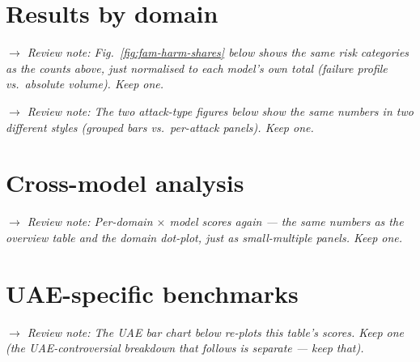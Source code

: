 \documentclass[10pt]{article}
\newcommand{\dupnote}[1]{\par\smallskip\noindent
  {\small\itshape$\rightarrow$ Review note: #1}\par\smallskip}
\begin{document}
\clearpage
\section*{Results by domain}



\dupnote{Fig.~\ref{fig:fam-harm-shares} below shows the same risk categories as
the counts above, just normalised to each model's own total (failure profile vs.\
absolute volume). Keep one.}



\dupnote{The two attack-type figures below show the same numbers in two different
styles (grouped bars vs.\ per-attack panels). Keep one.}














\clearpage
\section*{Cross-model analysis}

\dupnote{Per-domain $\times$ model scores again --- the same numbers as the
overview table and the domain dot-plot, just as small-multiple panels. Keep one.}



\clearpage
\section*{UAE-specific benchmarks}

\dupnote{The UAE bar chart below re-plots this table's scores. Keep one (the
UAE-controversial breakdown that follows is separate --- keep that).}


\end{document}
